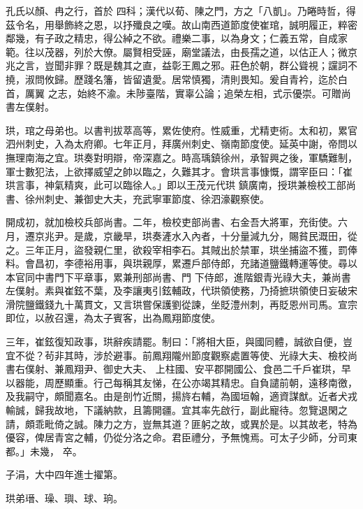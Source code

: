\begin{pinyinscope}
 孔氏以顏、冉之行，首於
 四科；漢代以荀、陳之門，方之「八凱」。乃睠時哲，得茲令名，用舉飾終之恩，以抒殲良之嘆。故山南西道節度使崔琯，誠明履正，粹密鄰幾，有子政之精忠，得公綽之不欲。禮樂二事，以為身文；仁義五常，自成家範。往以茂器，列於大僚。屬賢相受誣，廟堂議法，由長孺之道，以估正人；微京兆之言，豈聞非罪？既是魏其之直，益彰王鳳之邪。莊色於朝，群公聳視；讜詞不撓，淑問攸歸。歷踐名籓，皆留遺愛。居常慎獨，清則畏知。爰自青衿，迄於白首，厲翼
 之志，始終不渝。未陟臺階，實辜公論；追榮左相，式示優崇。可贈尚書左僕射。



 珙，琯之母弟也。以書判拔萃高等，累佐使府。性威重，尤精吏術。太和初，累官泗州刺史，入為太府卿。七年正月，拜廣州刺史、嶺南節度使。延英中謝，帝問以撫理南海之宜。珙奏對明辯，帝深嘉之。時高瑀鎮徐州，承智興之後，軍驕難制，軍士數犯法，上欲擇威望之帥以臨之，久難其才。會珙言事慷慨，謂宰臣曰：「崔珙言事，神氣精爽，此可以臨徐人。」即以王茂元代珙
 鎮廣南，授珙兼檢校工部尚書、徐州刺史、兼御史大夫，充武寧軍節度、徐泗濠觀察使。



 開成初，就加檢校兵部尚書。二年，檢校吏部尚書、右金吾大將軍，充街使。六月，遷京兆尹。是歲，京畿旱，珙奏滻水入內者，十分量減九分，賜貧民溉田，從之。三年正月，盜發親仁里，欲殺宰相李石。其賊出於禁軍，珙坐捕盜不獲，罰俸料。會昌初，李德裕用事，與珙親厚，累遷戶部侍郎，充諸道鹽鐵轉運等使。尋以本官同中書門下平章事，累兼刑部尚書、門
 下侍郎，進階銀青光祿大夫，兼尚書左僕射。素與崔鉉不葉，及李讓夷引鉉輔政，代珙領使務，乃掎摭珙領使日妄破宋滑院鹽鐵錢九十萬貫文，又言珙嘗保護劉從諫，坐貶澧州刺，再貶恩州司馬。宣宗即位，以赦召還，為太子賓客，出為鳳翔節度使。



 三年，崔鉉復知政事，珙辭疾請罷。制曰：「將相大臣，與國同體，誠欲自便，豈宜不從？茍非其時，涉於避事。前鳳翔隴州節度觀察處置等使、光祿大夫、檢校尚書右僕射、兼鳳翔尹、御史大夫、
 上柱國、安平郡開國公、食邑二千戶崔珙，早以器能，周歷顯重。行己每稱其友悌，在公亦竭其精忠。自負譴前朝，遠移南徼，及我嗣守，頗聞嘉名。由是剖竹近關，揚旍右輔，為國垣翰，適資謀猷。近者犬戎輸誠，歸我故地，下議納款，且籌開疆。宜其率先啟行，副此寵待。忽覽退閑之請，頗乖毗倚之誠。陳力之方，豈無其道？匪躬之故，或異於是。以其故老，特為優容，俾居青宮之輔，仍從分洛之命。君臣禮分，予無愧焉。可太子少師，分司東都。」未幾，
 卒。



 子涓，大中四年進士擢第。



 珙弟瑨、璪、璵、球、珦。




\end{pinyinscope}

